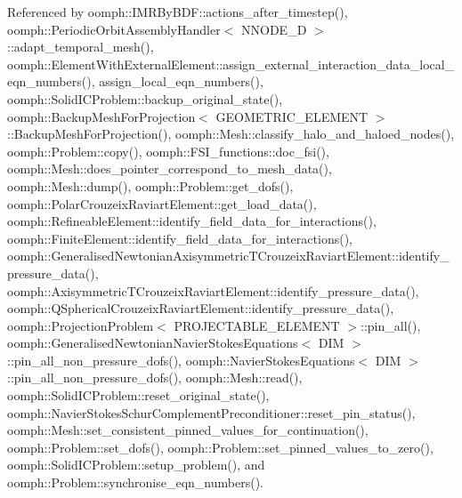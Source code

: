 Referenced by oomph\+::\+I\+M\+R\+By\+B\+D\+F\+::actions\+\_\+after\+\_\+timestep(), oomph\+::\+Periodic\+Orbit\+Assembly\+Handler$<$ N\+N\+O\+D\+E\+\_\+D $>$\+::adapt\+\_\+temporal\+\_\+mesh(), oomph\+::\+Element\+With\+External\+Element\+::assign\+\_\+external\+\_\+interaction\+\_\+data\+\_\+local\+\_\+eqn\+\_\+numbers(), assign\+\_\+local\+\_\+eqn\+\_\+numbers(), oomph\+::\+Solid\+I\+C\+Problem\+::backup\+\_\+original\+\_\+state(), oomph\+::\+Backup\+Mesh\+For\+Projection$<$ G\+E\+O\+M\+E\+T\+R\+I\+C\+\_\+\+E\+L\+E\+M\+E\+N\+T $>$\+::\+Backup\+Mesh\+For\+Projection(), oomph\+::\+Mesh\+::classify\+\_\+halo\+\_\+and\+\_\+haloed\+\_\+nodes(), oomph\+::\+Problem\+::copy(), oomph\+::\+F\+S\+I\+\_\+functions\+::doc\+\_\+fsi(), oomph\+::\+Mesh\+::does\+\_\+pointer\+\_\+correspond\+\_\+to\+\_\+mesh\+\_\+data(), oomph\+::\+Mesh\+::dump(), oomph\+::\+Problem\+::get\+\_\+dofs(), oomph\+::\+Polar\+Crouzeix\+Raviart\+Element\+::get\+\_\+load\+\_\+data(), oomph\+::\+Refineable\+Element\+::identify\+\_\+field\+\_\+data\+\_\+for\+\_\+interactions(), oomph\+::\+Finite\+Element\+::identify\+\_\+field\+\_\+data\+\_\+for\+\_\+interactions(), oomph\+::\+Generalised\+Newtonian\+Axisymmetric\+T\+Crouzeix\+Raviart\+Element\+::identify\+\_\+pressure\+\_\+data(), oomph\+::\+Axisymmetric\+T\+Crouzeix\+Raviart\+Element\+::identify\+\_\+pressure\+\_\+data(), oomph\+::\+Q\+Spherical\+Crouzeix\+Raviart\+Element\+::identify\+\_\+pressure\+\_\+data(), oomph\+::\+Projection\+Problem$<$ P\+R\+O\+J\+E\+C\+T\+A\+B\+L\+E\+\_\+\+E\+L\+E\+M\+E\+N\+T $>$\+::pin\+\_\+all(), oomph\+::\+Generalised\+Newtonian\+Navier\+Stokes\+Equations$<$ D\+I\+M $>$\+::pin\+\_\+all\+\_\+non\+\_\+pressure\+\_\+dofs(), oomph\+::\+Navier\+Stokes\+Equations$<$ D\+I\+M $>$\+::pin\+\_\+all\+\_\+non\+\_\+pressure\+\_\+dofs(), oomph\+::\+Mesh\+::read(), oomph\+::\+Solid\+I\+C\+Problem\+::reset\+\_\+original\+\_\+state(), oomph\+::\+Navier\+Stokes\+Schur\+Complement\+Preconditioner\+::reset\+\_\+pin\+\_\+status(), oomph\+::\+Mesh\+::set\+\_\+consistent\+\_\+pinned\+\_\+values\+\_\+for\+\_\+continuation(), oomph\+::\+Problem\+::set\+\_\+dofs(), oomph\+::\+Problem\+::set\+\_\+pinned\+\_\+values\+\_\+to\+\_\+zero(), oomph\+::\+Solid\+I\+C\+Problem\+::setup\+\_\+problem(), and oomph\+::\+Problem\+::synchronise\+\_\+eqn\+\_\+numbers().

\mbox{\label{classoomph_1_1GeneralisedElement_a588d15a39b8c656c354f8e4873d394b3}} 
